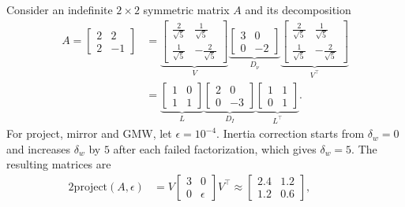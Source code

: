 \documentclass[class=scrbook, crop=false]{standalone}
\begin{document}
\begin{example}
\label{ex:reg_comparison}
Consider an indefinite $2\times2$ symmetric matrix $A$ and its decomposition
\begin{equation*}
\begin{aligned}
    A = \begin{bmatrix} 2 & 2 \\ 2 & -1 \end{bmatrix}
&= \underbrace{\begin{bmatrix} \tfrac{2}{\sqrt{5}} & \tfrac{1}{\sqrt{5}} \\ \tfrac{1}{\sqrt{5}} & -\tfrac{2}{\sqrt{5}} \end{bmatrix}}_{V}
       \underbrace{\begin{bmatrix} 3 & 0 \\ 0 & -2 \end{bmatrix}}_{D_\nu}
       \underbrace{\begin{bmatrix} \tfrac{2}{\sqrt{5}} & \tfrac{1}{\sqrt{5}} \\ \tfrac{1}{\sqrt{5}} & -\tfrac{2}{\sqrt{5}} \end{bmatrix}}_{V^\top} \\
    &= \underbrace{\begin{bmatrix} 1 & 0 \\ 1 & 1 \end{bmatrix}}_{L}
       \underbrace{\begin{bmatrix} 2 & 0 \\ 0 & -3 \end{bmatrix}}_{D_I}
       \underbrace{\begin{bmatrix} 1 & 1 \\ 0 & 1 \end{bmatrix}}_{L^\top}.
\end{aligned}
\end{equation*}
For project, mirror and \gls{GMW}, let $\epsilon = 10^{-4}$.
Inertia correction starts from $\delta_w = 0$ and increases $\delta_w$ by $5$ after each failed factorization,
which gives $\delta_w = 5$.
The resulting matrices are
\begin{alignat*}{2}
    \mathrm{project}(A,\epsilon) &= V \begin{bmatrix} 3 & 0 \\ 0 & \epsilon \end{bmatrix} V^\top
        \approx \begin{bmatrix} 2.4 & 1.2 \\ 1.2 & 0.6 \end{bmatrix}, &\qquad

\end{alignat*}
\end{example}
\end{document}
